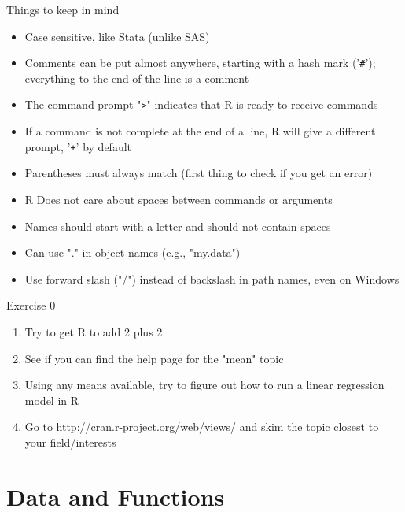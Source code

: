 \documentclass[table,smaller]{beamer}
\begin{document}
\begin{frame}[fragile,label=sec-2-6]{Things to keep in mind}
 \begin{itemize}
\item Case sensitive, like Stata (unlike SAS)

\item Comments can be put almost anywhere, starting with a hash mark ('\texttt{\#}'); everything to the end of the line is a comment

\item The command prompt "\texttt{>}" indicates that R is ready to receive commands

\item If a command is not complete at the end of a line, R will give a different prompt, '\texttt{+}' by default

\item Parentheses must always match (first thing to check if you get an error)

\item R Does not care about spaces between commands or arguments

\item Names should start with a letter and should not contain spaces

\item Can use "." in object names (e.g., "my.data")

\item Use forward slash ("/") instead of backslash in path names, even on Windows
\end{itemize}
\end{frame}


\begin{frame}[label=sec-2-7]{Exercise 0}
\begin{enumerate}
\item Try to get R to add 2 plus 2
\item See if you can find the help page for the "mean" topic
\item Using any means available, try to figure out how to run a linear regression model in R
\item Go to \url{http://cran.r-project.org/web/views/} and skim the topic closest to your field/interests
\end{enumerate}
\end{frame}


\section{Data and Functions}
\label{sec-3}
\end{document}
